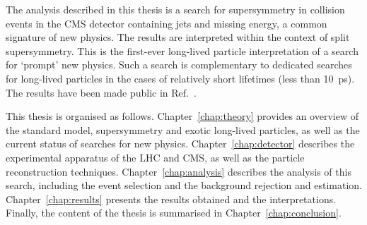 The analysis described in this thesis is a search for supersymmetry in 
collision events in the CMS detector containing jets and missing energy, a 
common signature of new physics. The results are interpreted within the context 
of split supersymmetry. This is the first-ever long-lived particle 
interpretation of a search for `prompt' new physics. 
Such a search is complementary to dedicated searches for long-lived particles 
in the cases of relatively short lifetimes (less than 10~ps). 
The results have been made public in Ref.~\cite{alphat6}.


This thesis is organised as follows. Chapter~\ref{chap:theory} provides an 
overview of the standard model, supersymmetry and exotic long-lived particles, 
as well as the current status of searches for new physics. 
Chapter~\ref{chap:detector} describes the experimental apparatus of the LHC and 
CMS, as well as the particle reconstruction techniques. 
Chapter~\ref{chap:analysis} describes the analysis of this search, including 
the event selection and the background rejection and estimation. 
Chapter~\ref{chap:results} presents the results obtained and the 
interpretations. 
Finally, the content of the thesis is summarised in 
Chapter~\ref{chap:conclusion}.

